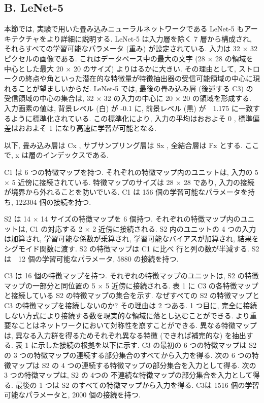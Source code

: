 \documentclass[twocolumn]{jarticle}     %
\begin{document}
 \subsection{B. LeNet-5}
 本節では, 実験で用いた畳み込みニューラルネットワークである LeNet-5 もアーキテクチャをより詳細に説明する.
  LeNet-5 は入力層を除く 7 層から構成され, それらすべての学習可能なパラメータ (重み) が設定されている. 入力は 32 × 32 ピクセルの画像である. これはデータベース中の最大の文字 (28 × 28 の領域を中心とした最大 20 × 20 のサイズ) よりはるかに大きい. その理由として, ストロークの終点や角といった潜在的な特徴量が特徴抽出器の受信可能領域の中心に現れることが望ましいからだ. LeNet-5 では, 最後の畳み込み層 (後述する C3) の受信領域の中心の集合は, 32 × 32 の入力の中心に 20 × 20 の領域を形成する. 入力画素の値は, 背景レベル (白) が -0.1 に, 前景レベル (黒) が　1.175 に一致するように標準化されている.
  この標準化により, 入力の平均はおおよそ 0 , 標準偏差はおおよそ 1 になり高速に学習が可能となる.
  \par
  以下, 畳み込み層は Cx , サブサンプリング層は Sx , 全結合層は Fx とする. ここで, x は層のインデックスである.
  \par
  C1 は 6 つの特徴マップを持つ. それぞれの特徴マップ内のユニットは, 入力の 5 × 5 近傍に接続されている. 特徴マップのサイズは 28 × 28 であり, 入力の接続が境界から外れることを防いでいる. C1 は 156 個の学習可能なパラメータを持ち, 122304 個の接続を持つ.
  \par
  S2 は 14 × 14 サイズの特徴マップを 6 個持つ. それぞれの特徴マップ内のユニットは, C1 の対応する 2 × 2 近傍に接続される. S2 内のユニットの 4 つの入力は加算され, 学習可能な係数が乗算され, 学習可能なバイアスが加算され, 結果をシグモイド関数に渡す. S2 の特徴マップは C1 に比べ 行と列の数が半減する. S2 は　12 個の学習可能なパラメータ, 5880 の接続を持つ.
  \par
  C3 は 16 個の特徴マップを持つ. それぞれの特徴マップのユニットは, S2 の特徴マップの一部分と同位置の 5 × 5 近傍に接続される.
  表 1 に C3 の各特徴マップと接続している S2 の特徴マップの集合を示す.
  なぜすべての S2 の特徴マップと C3 の特徴マップを接続しないのか? その理由は 2 つある. 1 つ目に, 完全に接続しない方式により接続する数を現実的な領域に落とし込むことができる. より重要なことはネットワークにおいて対称性を崩すことができる. 異なる特徴マップは, 異なる入力群を得るためそれぞれ異なる特徴 (できれば補完的な) を抽出する. 表 1 に示した接続の根拠を以下に示す. 
  C3 の最初の 6 つの特徴マップは S2 の 3 つの特徴マップの連続する部分集合のすべてから入力を得る. 次の 6 つの特徴マップは S2 の 4 つの連続する特徴マップの部分集合を入力として得る. 次の 3 つの特徴マップは, S2 の 4つの 不連続な特徴マップの部分集合を入力として得る. 最後の 1 つは S2 のすべての特徴マップから入力を得る. C3は 1516 個の学習可能なパラメータと, 2000 個の接続を持つ.
\end{document}
